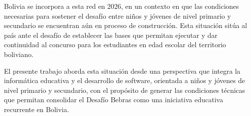 Bolivia se incorpora a esta red en 2026, en un contexto en que las condiciones necesarias para sostener el desafío entre niños y jóvenes de nivel primario y secundario se encuentran aún en proceso de construcción. Esta situación sitúa al país ante el desafío de establecer las bases que permitan ejecutar y dar continuidad al concurso para los estudiantes en edad escolar del territorio boliviano.

El presente trabajo aborda esta situación desde una perspectiva que integra la informática educativa y el desarrollo de software, orientada a niños y jóvenes de nivel primario y secundario, con el propósito de generar las condiciones técnicas que permitan consolidar el Desafío Bebras como una iniciativa educativa recurrente en Bolivia.